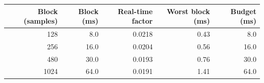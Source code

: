 \begin{tabular}{rrrrr}
\toprule
Block (samples) & Block (ms) & Real-time factor & Worst block (ms) & Budget (ms) \\
\midrule
128 & 8.0 & 0.0218 & 0.43 & 8.0 \\
256 & 16.0 & 0.0204 & 0.56 & 16.0 \\
480 & 30.0 & 0.0193 & 0.76 & 30.0 \\
1024 & 64.0 & 0.0191 & 1.41 & 64.0 \\
\bottomrule
\end{tabular}
